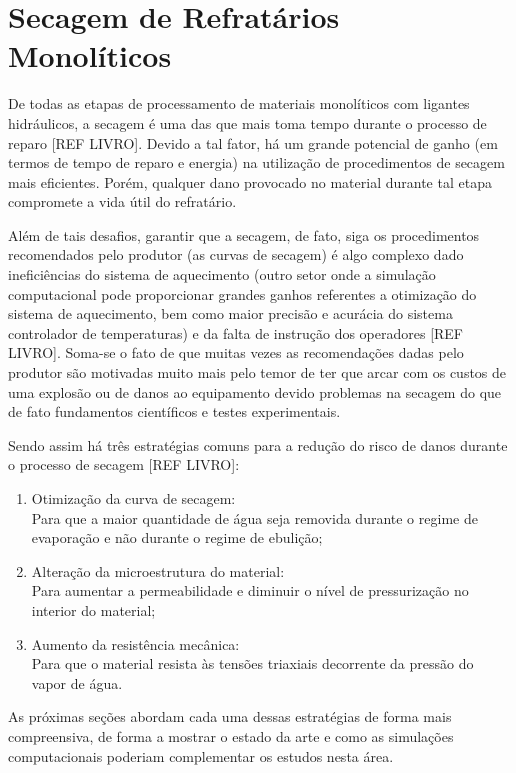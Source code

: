 \section{Secagem de Refratários Monolíticos}\label{secagem}
De todas as etapas de processamento de materiais monolíticos com ligantes
hidráulicos, a secagem é uma das que mais toma tempo durante o processo de
reparo [REF LIVRO]. Devido a tal fator, há um grande potencial de ganho (em
termos de tempo de reparo e energia) na utilização de procedimentos de secagem
mais eficientes. Porém, qualquer dano provocado no material durante tal etapa
compromete a vida útil do refratário.

Além de tais desafios, garantir que a secagem, de fato, siga os procedimentos
recomendados pelo produtor (as curvas de secagem) é algo complexo dado
ineficiências do sistema de aquecimento (outro setor onde a simulação
computacional pode proporcionar grandes ganhos referentes a otimização do
sistema de aquecimento, bem como maior precisão e acurácia do sistema
controlador de temperaturas) e da falta de instrução dos operadores [REF LIVRO]. Soma-se o
fato de que muitas vezes as recomendações dadas pelo produtor são motivadas muito
mais pelo temor de ter que arcar com os custos de uma explosão ou de danos ao
equipamento devido problemas na secagem do que de fato fundamentos científicos e
testes experimentais.

Sendo assim há três estratégias comuns para a redução do risco de danos durante
o processo de secagem [REF LIVRO]:

\begin{enumerate}
\item Otimização da curva de secagem: \\ Para que a maior quantidade de água
  seja removida durante o regime de evaporação e não durante o regime de ebulição;
\item Alteração da microestrutura do material: \\ Para aumentar a permeabilidade e
  diminuir o nível de pressurização no interior do material;
\item Aumento da resistência mecânica: \\ Para que o material resista às tensões
  triaxiais decorrente da pressão do vapor de água.
\end{enumerate}

As próximas seções abordam cada uma dessas estratégias de forma mais
compreensiva, de forma a mostrar o estado da arte e como as simulações
computacionais poderiam complementar os estudos nesta área.

